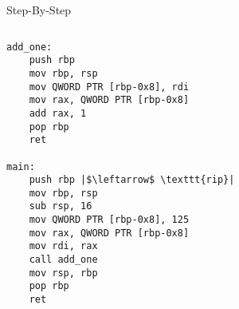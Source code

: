 \documentclass[hyphens,aspectratio=169]{beamer}
\begin{document}
\begin{frame}[fragile]{Step-By-Step}
    \begin{columns}
        \begin{column}{0.33\textwidth}
            \begin{verbatim}
add_one:
    push rbp
    mov rbp, rsp
    mov QWORD PTR [rbp-0x8], rdi
    mov rax, QWORD PTR [rbp-0x8]
    add rax, 1
    pop rbp
    ret

main:
    push rbp |$\leftarrow$ \texttt{rip}|
    mov rbp, rsp
    sub rsp, 16
    mov QWORD PTR [rbp-0x8], 125
    mov rax, QWORD PTR [rbp-0x8]
    mov rdi, rax
    call add_one
    mov rsp, rbp
    pop rbp
    ret
            \end{verbatim}
        \end{column}
        \begin{column}{0.33\textwidth}
\end{column}
\end{columns}
\end{frame}
\end{document}
